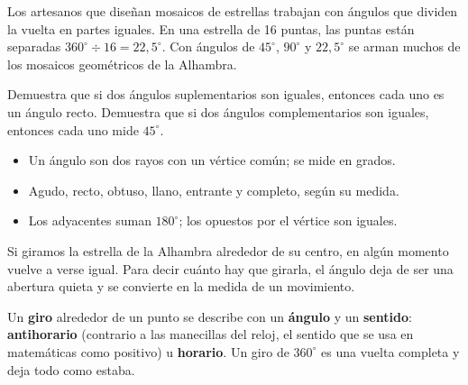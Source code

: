 \documentclass[11pt]{article}
\begin{document}
\begin{aplicacion}
Los artesanos que diseñan mosaicos de estrellas trabajan con ángulos que dividen la vuelta en
partes iguales. En una estrella de 16 puntas, las puntas están separadas
$360^\circ \div 16 = 22{,}5^\circ$. Con ángulos de $45^\circ$, $90^\circ$ y $22{,}5^\circ$ se arman
muchos de los mosaicos geométricos de la Alhambra.
\end{aplicacion}

\begin{preguntas}
\pregunta Demuestra que si dos ángulos suplementarios son iguales, entonces cada uno es un
ángulo recto.
\pregunta Demuestra que si dos ángulos complementarios son iguales, entonces cada uno mide
$45^\circ$.
\end{preguntas}

\begin{resumen}
\begin{itemize}
  \item Un ángulo son dos rayos con un vértice común; se mide en grados.
  \item Agudo, recto, obtuso, llano, entrante y completo, según su medida.
  \item Los adyacentes suman $180^\circ$; los opuestos por el vértice son iguales.
\end{itemize}
\end{resumen}

\label{tema:giros}

\begin{hilo}
Si giramos la estrella de la Alhambra alrededor de su centro, en algún momento vuelve a verse
igual. Para decir cuánto hay que girarla, el ángulo deja de ser una abertura quieta y se
convierte en la medida de un movimiento.
\end{hilo}

\begin{definicion}[Giro]
Un \textbf{giro} alrededor de un punto se describe con un \textbf{ángulo} y un \textbf{sentido}:
\textbf{antihorario} (contrario a las manecillas del reloj, el sentido que se usa en matemáticas
como positivo) u \textbf{horario}. Un giro de $360^\circ$ es una vuelta completa y deja todo como
estaba.
\end{definicion}
\end{document}
